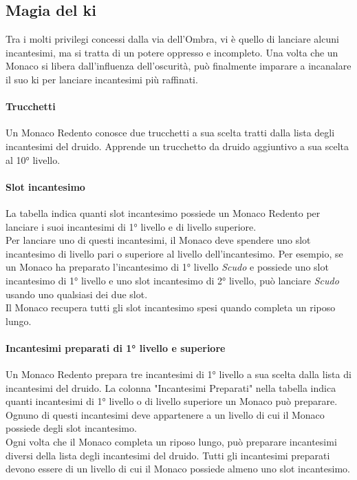 \subsection{Magia del ki}

Tra i molti privilegi concessi dalla via dell'Ombra, vi è quello di lanciare alcuni incantesimi, ma si tratta di un potere oppresso e incompleto. Una volta che un Monaco si libera dall'influenza dell'oscurità, può finalmente imparare a incanalare il suo ki per lanciare incantesimi più raffinati.

\paragraph{Trucchetti} Un Monaco Redento conosce due trucchetti a sua scelta tratti dalla lista degli incantesimi del druido. Apprende un trucchetto da druido aggiuntivo a sua scelta al 10° livello.

\paragraph{Slot incantesimo}La tabella indica quanti slot incantesimo possiede un Monaco Redento per lanciare i suoi incantesimi di 1° livello e di livello superiore. \\ Per lanciare uno di questi incantesimi, il Monaco deve spendere uno slot incantesimo di livello pari o superiore al livello dell'incantesimo. Per esempio, se un Monaco ha preparato l'incantesimo di 1° livello \textit{Scudo} e possiede uno slot incantesimo di 1° livello e uno slot incantesimo di 2° livello, può lanciare \textit{Scudo} usando uno qualsiasi dei due slot. \\ Il Monaco recupera tutti gli slot incantesimo spesi quando completa un riposo lungo.

\paragraph{Incantesimi preparati di 1° livello e superiore}Un Monaco Redento prepara tre incantesimi di 1° livello a sua scelta dalla lista di incantesimi del druido. La colonna "Incantesimi Preparati" nella tabella indica quanti incantesimi di 1° livello o di livello superiore un Monaco può preparare. Ognuno di questi incantesimi deve appartenere a un livello di cui il Monaco possiede degli slot incantesimo.\\ Ogni volta che il Monaco completa un riposo lungo, può preparare incantesimi diversi della lista degli incantesimi del druido. Tutti gli incantesimi preparati devono essere di un livello di cui il Monaco possiede almeno uno slot incantesimo.

